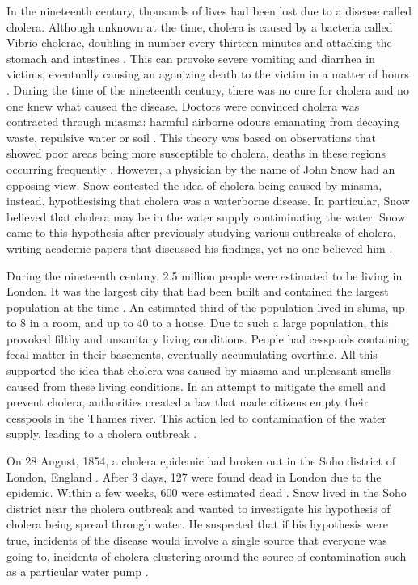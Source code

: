 \documentclass[12pt]{article}
\begin{document}
In the nineteenth century, thousands of lives had been lost due to a disease called cholera. Although unknown at the time, cholera is caused by a bacteria called Vibrio cholerae, doubling in number every thirteen minutes and attacking the stomach and intestines \cite{channel1}. This can provoke severe vomiting and diarrhea in victims, eventually causing an agonizing death to the victim in a matter of hours \cite{heros, channel1}. During the time of the nineteenth century, there was no cure for cholera and no one knew what caused the disease. Doctors were convinced cholera was contracted through miasma: harmful airborne odours emanating from decaying waste, repulsive water or soil \cite{test}. This theory was based on observations that showed poor areas being more susceptible to cholera, deaths in these regions occurring frequently \cite{heros}. However, a physician by the name of John Snow had an opposing view. Snow contested the idea of cholera being caused by miasma, instead, hypothesising that cholera was a waterborne disease. In particular, Snow believed that cholera may be in the water supply contiminating the water. Snow came to this hypothesis after previously studying various outbreaks of cholera, writing academic papers that discussed his findings, yet no one believed him \cite{original}. 

During the nineteenth century, 2.5 million people were estimated to be living in London. It was the largest city that had been built and contained the largest population at the time \cite{channel1, tedtalk}. An estimated third of the population lived in slums, up to 8 in a room, and up to 40 to a house. Due to such a large population, this provoked filthy and unsanitary living conditions. People had cesspools containing fecal matter in their basements, eventually accumulating overtime. All this supported the idea that cholera was caused by miasma and unpleasant smells caused from these living conditions. In an attempt to mitigate the smell and prevent cholera, authorities created a law that made citizens empty their cesspools in the Thames river. This action led to contamination of the water supply, leading to a cholera outbreak \cite{tedtalk, johnson}. 

On 28 August, 1854, a cholera epidemic had broken out in the Soho district of London, England \cite{tedtalk}. After 3 days, 127 were found dead in London due to the epidemic. Within a few weeks, 600 were estimated dead \cite{youtube, tedtalk}. Snow lived in the Soho district near the cholera outbreak and wanted to investigate his hypothesis of cholera being spread through water. He suspected that if his hypothesis were true, incidents of the disease would involve a single source that everyone was going to, incidents of cholera clustering around the source of contamination such as a particular water pump \cite{test, tedtalk, johnson}. 
\end{document}
